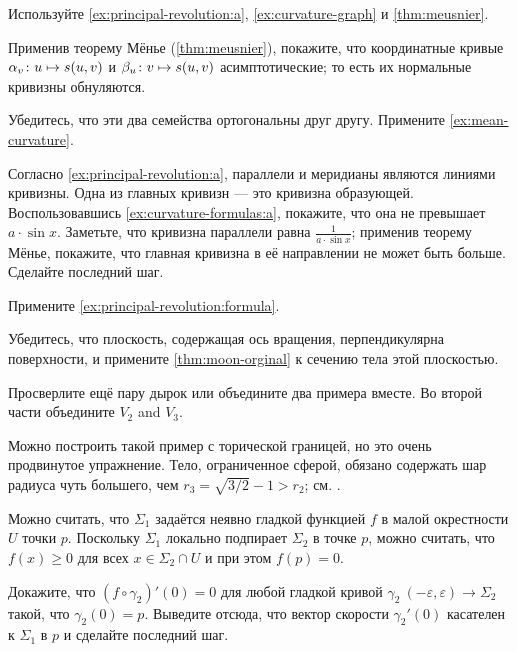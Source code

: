 Используйте \ref{ex:principal-revolution:a},  \ref{ex:curvature-graph} и \ref{thm:meusnier}.

Применив теорему Мёнье (\ref{thm:meusnier}), покажите, что координатные кривые $\alpha_v\:u\z\mapsto s(u,v)$ и $\beta_u\:v\z\mapsto s(u,v)$ асимптотические; то есть их нормальные кривизны обнуляются.

Убедитесь, что эти два семейства ортогональны друг другу.
Примените \ref{ex:mean-curvature}.

Согласно \ref{ex:principal-revolution:a}, параллели и меридианы являются линиями кривизны.
Одна из главных кривизн --- это кривизна образующей.
Воспользовавшись \ref{ex:curvature-formulas:a}, покажите, что она не превышает $a\cdot \sin x$.
Заметьте, что кривизна параллели равна $\tfrac1{a\cdot \sin x}$;
применив теорему Мёнье, покажите, что главная кривизна в её направлении не может быть больше.
Сделайте последний шаг.

Примените \ref{ex:principal-revolution:formula}.

Убедитесь, что плоскость, содержащая ось вращения, перпендикулярна поверхности, и примените \ref{thm:moon-orginal} к сечению тела этой плоскостью.

Просверлите ещё пару дырок или объедините два примера вместе.
Во второй части объедините $V_2$ and $V_3$.

Можно построить такой пример с торической границей, но это очень продвинутое упражнение.
Тело, ограниченное сферой, обязано содержать шар радиуса чуть большего, чем $r_3=\sqrt{3/2}-1>r_2$; см. \cite{lagunov-1960, lagunov-1961, lagunov-fet-1963, lagunov-fet-1965}.



\setcounter{eqtn}{0}

Можно считать, что $\Sigma_1$ задаётся неявно гладкой функцией $f$ в малой окрестности $U$ точки $p$.
Поскольку $\Sigma_1$ локально подпирает $\Sigma_2$ в точке $p$, можно считать, что $f(x)\ge 0$ для всех $x\in \Sigma_2\cap U$
и при этом $f(p)=0$.

Докажите, что $(f\circ\gamma_2)'(0)=0$ для любой гладкой кривой $\gamma_2\:(-\varepsilon,\varepsilon)\to\Sigma_2$ такой, что $\gamma_2(0)=p$.
Выведите отсюда, что вектор скорости $\gamma_2'(0)$ касателен к $\Sigma_1$ в $p$ и сделайте последний шаг.

